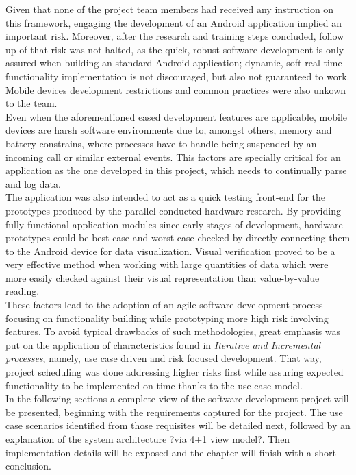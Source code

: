 	Given that none of the project team members had received any instruction on this framework, engaging the development of an Android application implied an important risk. Moreover, after the research and training steps concluded, follow up of that risk was not halted, as the quick, robust software development is only assured when building an standard Android application; dynamic, soft real-time functionality implementation is not discouraged, but also not guaranteed to work.
	Mobile devices development restrictions and common practices were also unkown to the team.\\

	Even when the aforementioned eased development features are applicable, mobile devices are harsh software environments due to, amongst others, memory and battery constrains, where processes have to handle being suspended by an incoming call or similar external events. This factors are specially critical for an application as the one developed in this project, which needs to continually parse and log data.\\

	The application was also intended to act as a quick testing front-end for the prototypes produced by the parallel-conducted hardware research. By providing fully-functional application modules since early stages of development, hardware prototypes could be best-case and worst-case checked by directly connecting them to the Android device for data visualization. Visual verification proved to be a very effective method when working with large quantities of data which were more easily checked against their visual representation than value-by-value reading.\\

	These factors lead to the adoption of an agile software development process focusing on functionality building while prototyping more high risk involving features. To avoid typical drawbacks of such methodologies, great emphasis was put on the application of characteristics found in \textit{Iterative and Incremental processes}, namely, use case driven and risk focused development. That way, project scheduling was done addressing higher risks first while assuring expected functionality to be implemented on time thanks to the use case model.\\

	In the following sections a complete view of the software development project will be presented, beginning with the requirements captured for the project. The use case scenarios identified from those requisites will be detailed next, followed by an explanation of the system architecture ?via 4+1 view model?. Then implementation details will be exposed and the chapter will finish with a short conclusion.

